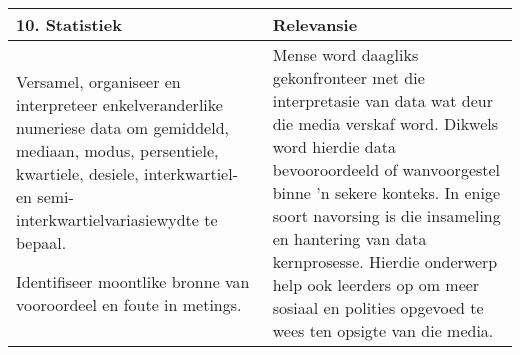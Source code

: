 \begin{table}[H]
 \begin{center} 
\begin{tabular}{|p{8.5cm}|p{3.5cm}|} \hline
\textbf{10. Statistiek}& \textbf{Relevansie}\\ \hline  
Versamel, organiseer en interpreteer enkelveranderlike numeriese data
om gemiddeld, mediaan, modus, persentiele, kwartiele, desiele,
interkwartiel- en semi-interkwartielvariasiewydte te bepaal.\par
Identifiseer moontlike bronne van vooroordeel en foute in metings.
&
Mense word daagliks gekonfronteer met die interpretasie van data wat
deur die media verskaf word. Dikwels word hierdie data bevooroordeeld of
wanvoorgestel binne 'n sekere konteks. In enige soort navorsing is die
insameling en hantering van data kernprosesse. Hierdie onderwerp help
ook leerders op om meer sosiaal en polities opgevoed te wees ten
opsigte van die media.
\\ \hline

 \end{tabular}
\end{center}
\end{table}


